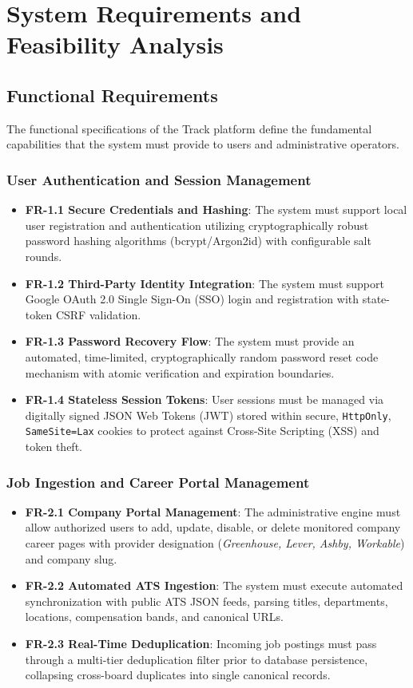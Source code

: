 \chapter{System Requirements and Feasibility Analysis}
\label{ch:requirements_feasibility}

\section{Functional Requirements}
The functional specifications of the Track platform define the fundamental capabilities that the system must provide to users and administrative operators.

\subsection{User Authentication and Session Management}
\begin{itemize}
    \item \textbf{FR-1.1 Secure Credentials and Hashing}: The system must support local user registration and authentication utilizing cryptographically robust password hashing algorithms (bcrypt/Argon2id) with configurable salt rounds.
    \item \textbf{FR-1.2 Third-Party Identity Integration}: The system must support Google OAuth 2.0 Single Sign-On (SSO) login and registration with state-token CSRF validation.
    \item \textbf{FR-1.3 Password Recovery Flow}: The system must provide an automated, time-limited, cryptographically random password reset code mechanism with atomic verification and expiration boundaries.
    \item \textbf{FR-1.4 Stateless Session Tokens}: User sessions must be managed via digitally signed JSON Web Tokens (JWT) \cite{rfc7519} stored within secure, \texttt{HttpOnly}, \texttt{SameSite=Lax} cookies to protect against Cross-Site Scripting (XSS) and token theft.
\end{itemize}

\subsection{Job Ingestion and Career Portal Management}
\begin{itemize}
    \item \textbf{FR-2.1 Company Portal Management}: The administrative engine must allow authorized users to add, update, disable, or delete monitored company career pages with provider designation (\textit{Greenhouse, Lever, Ashby, Workable}) and company slug.
    \item \textbf{FR-2.2 Automated ATS Ingestion}: The system must execute automated synchronization with public ATS JSON feeds, parsing titles, departments, locations, compensation bands, and canonical URLs.
    \item \textbf{FR-2.3 Real-Time Deduplication}: Incoming job postings must pass through a multi-tier deduplication filter prior to database persistence, collapsing cross-board duplicates into single canonical records.
\end{itemize}

